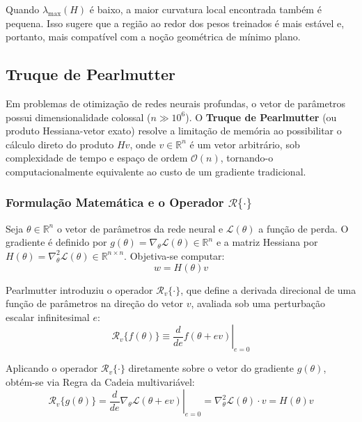 \documentclass[12pt, a4paper]{article}
\begin{document}
Quando \(\lambda_{\max}(H)\) é baixo, a maior curvatura local encontrada também
é pequena. Isso sugere que a região ao redor dos pesos treinados é mais estável
e, portanto, mais compatível com a noção geométrica de mínimo plano.

\subsection{Truque de Pearlmutter}
Em problemas de otimização de redes neurais profundas, o vetor de parâmetros possui dimensionalidade colossal ($n \gg 10^6$). O \textbf{Truque de Pearlmutter} (ou produto Hessiana-vetor exato) resolve a limitação de memória ao possibilitar o cálculo direto do produto $H v$, onde $v \in \mathbb{R}^n$ é um vetor arbitrário, sob complexidade de tempo e espaço de ordem \textbf{$\mathcal{O}(n)$}, tornando-o computacionalmente equivalente ao custo de um gradiente tradicional.

\subsubsection{Formulação Matemática e o Operador $\mathcal{R}\{\cdot\}$}
Seja $\theta \in \mathbb{R}^n$ o vetor de parâmetros da rede neural e $\mathcal{L}(\theta)$ a função de perda. O gradiente é definido por $g(\theta) = \nabla_{\theta} \mathcal{L}(\theta) \in \mathbb{R}^n$ e a matriz Hessiana por $H(\theta) = \nabla_{\theta}^2 \mathcal{L}(\theta) \in \mathbb{R}^{n \times n}$. Objetiva-se computar:
\begin{equation}
w = H(\theta) v
\end{equation}

Pearlmutter introduziu o operador $\mathcal{R}_v\{\cdot\}$, que define a derivada direcional de uma função de parâmetros na direção do vetor $v$, avaliada sob uma perturbação escalar infinitesimal $e$:
\begin{equation}
\mathcal{R}_v \{ f(\theta) \} \equiv \left. \frac{d}{de} f(\theta + ev) \right|_{e=0}
\end{equation}

Aplicando o operador $\mathcal{R}_v\{\cdot\}$ diretamente sobre o vetor do gradiente $g(\theta)$, obtém-se via Regra da Cadeia multivariável:
\begin{equation}
\mathcal{R}_v \{ g(\theta) \} = \left. \frac{d}{de} \nabla_{\theta} \mathcal{L}(\theta + ev) \right|_{e=0} = \nabla_{\theta}^2 \mathcal{L}(\theta) \cdot v = H(\theta)v
\end{equation}
\end{document}
